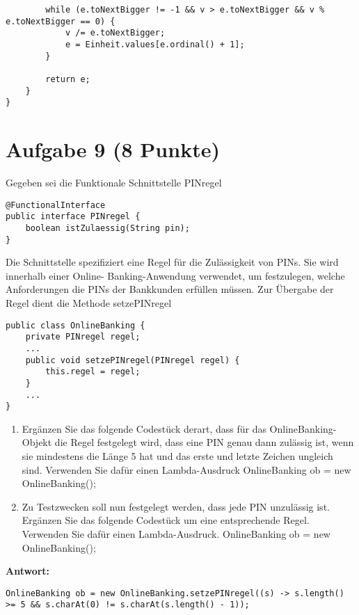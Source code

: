 {\begin{lstlisting}
        while (e.toNextBigger != -1 && v > e.toNextBigger && v % e.toNextBigger == 0) {
            v /= e.toNextBigger;
            e = Einheit.values[e.ordinal() + 1];
        }

        return e;
    }
}
\end{lstlisting}

\section{Aufgabe 9 (8 Punkte)}

Gegeben sei die Funktionale Schnittstelle PINregel

\begin{lstlisting}
@FunctionalInterface
public interface PINregel {
    boolean istZulaessig(String pin);
}
\end{lstlisting}

Die Schnittstelle spezifiziert eine Regel für die Zulässigkeit von PINs. Sie
wird innerhalb einer Online- Banking-Anwendung verwendet, um festzulegen,
welche Anforderungen die PINs der Bankkunden erfüllen müssen. Zur Übergabe der
Regel dient die Methode setzePINregel

\begin{lstlisting}
public class OnlineBanking {
    private PINregel regel;
    ...
    public void setzePINregel(PINregel regel) {
        this.regel = regel;
    }
    ...
}
\end{lstlisting}

\begin{enumerate}
    \item Ergänzen Sie das folgende Codestück derart, dass für das OnlineBanking-Objekt
          die Regel festgelegt wird, dass eine PIN genau dann zulässig ist, wenn sie
          mindestens die Länge 5 hat und das erste und letzte Zeichen ungleich sind.
          Verwenden Sie dafür einen Lambda-Ausdruck OnlineBanking ob = new
          OnlineBanking();
    \item Zu Testzwecken soll nun festgelegt werden, dass jede PIN unzulässig ist.
          Ergänzen Sie das folgende Codestück um eine entsprechende Regel. Verwenden Sie
          dafür einen Lambda-Ausdruck. OnlineBanking ob = new OnlineBanking();
\end{enumerate}

\textbf{Antwort:}

\begin{lstlisting}
OnlineBanking ob = new OnlineBanking.setzePINregel((s) -> s.length() >= 5 && s.charAt(0) != s.charAt(s.length() - 1));


\end{lstlisting}}
